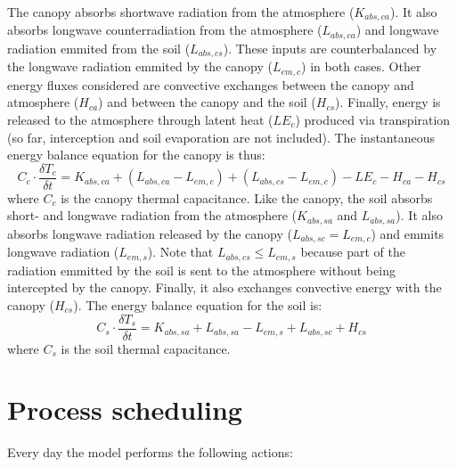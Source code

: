\documentclass[]{book}
\begin{document}
The canopy absorbs shortwave radiation from the atmosphere (\(K_{abs,ca}\)). It also absorbs longwave counterradiation from the atmosphere (\(L_{abs,ca}\)) and longwave radiation emmited from the soil (\(L_{abs,cs}\)). These inputs are counterbalanced by the longwave radiation emmited by the canopy (\(L_{em,c}\)) in both cases. Other energy fluxes considered are convective exchanges between the canopy and atmosphere (\(H_{ca}\)) and between the canopy and the soil (\(H_{cs}\)). Finally, energy is released to the atmosphere through latent heat (\(LE_{c}\)) produced via transpiration (so far, interception and soil evaporation are not included). The instantaneous energy balance equation for the canopy is thus:
\begin{equation}
  C_{c} \cdot \frac{\delta T_{c}}{\delta t} = K_{abs,ca} + (L_{abs,ca} - L_{em,c}) + (L_{abs,cs} - L_{em,c}) - LE_{c} - H_{ca} - H_{cs} 
\end{equation}
where \(C_{c}\) is the canopy thermal capacitance. Like the canopy, the soil absorbs short- and longwave radiation from the atmosphere (\(K_{abs,sa}\) and \(L_{abs,sa}\)). It also absorbs longwave radiation released by the canopy (\(L_{abs,sc} = L_{em,c}\)) and emmits longwave radiation (\(L_{em,s}\)). Note that \(L_{abs,cs} \leq L_{em,s}\) because part of the radiation emmitted by the soil is sent to the atmosphere without being intercepted by the canopy. Finally, it also exchanges convective energy with the canopy (\(H_{cs}\)). The energy balance equation for the soil is:
\begin{equation}
  C_{s} \cdot \frac{\delta T_{s}}{\delta t} = K_{abs,sa} + L_{abs,sa} - L_{em,s} + L_{abs,sc} + H_{cs} 
\end{equation}
where \(C_{s}\) is the soil thermal capacitance.

\hypertarget{process-scheduling-1}{%
\section{Process scheduling}\label{process-scheduling-1}}

Every day the model performs the following actions:
\end{document}
